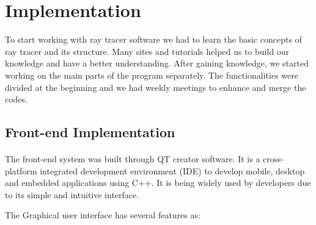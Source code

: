 \documentclass{article}
\begin{document}
\section{Implementation}

To start working with ray tracer software we had to learn the basic concepts of ray tracer and its structure. Many sites and tutorials helped us to build our knowledge and  have a better understanding. After gaining knowledge, we started working on the main parts of the program separately. The functionalities were divided at the beginning and we had  weekly meetings to enhance and merge the codes.  

\subsection{Front-end Implementation}
\paragraph{} The front-end system was built through QT creator software. It is a cross-platform integrated development environment (IDE) to develop mobile, desktop and embedded applications using C++. It is being widely used by developers due to its simple and intuitive interface.   

The Graphical user interface has several features as: 
\end{document}
